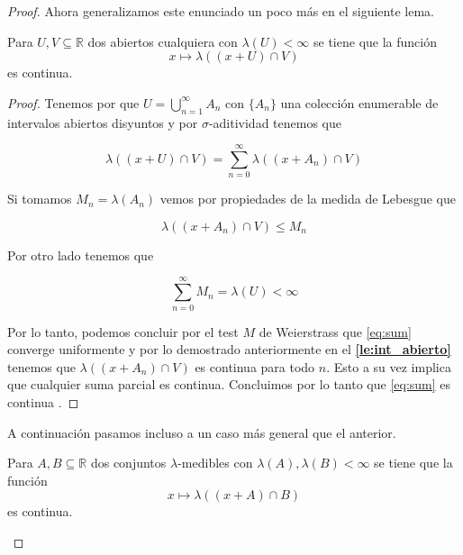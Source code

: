 \documentclass[letter,twoside,12pt]{article}
\numberwithin{equation}{section}
\begin{document}
\begin{proof}
Ahora generalizamos este enunciado un poco más en el siguiente lema.

\begin{lemma} \label{le:abierto}
Para $ U, V \subseteq \mathbb{R}$ dos abiertos cualquiera con $ \lambda(U) < \infty $ se tiene que la función
\begin{equation*}
	x \mapsto \lambda((x+U) \cap V ) \nonumber
\end{equation*} es continua. 
\end{lemma}

\begin{proof}
Tenemos por \cite[Teorema 6.59]{hewitt} que $U = \bigcup_{n = 1}^\infty A_n $ con $\{A_n\}$ una colección enumerable de intervalos abiertos disyuntos y por $\sigma$-aditividad tenemos que

\begin{equation}
\lambda((x+U) \cap V ) = \sum_{n=0}^\infty \lambda((x+A_n) \cap V ) \label{eq:sum}
\end{equation}

Si tomamos $M_n = \lambda(A_n)$ vemos por propiedades de la medida de Lebesgue que 

\begin{equation*}
 \lambda((x+A_n) \cap V ) \leq M_n \nonumber
\end{equation*}

Por otro lado tenemos que

\begin{equation*}
\sum_{n=0}^\infty  M_n = \lambda(U) < \infty \nonumber
\end{equation*}
 
Por lo tanto, podemos concluir por el test $M$ de Weierstrass \cite[Teorema 7.10]{rudin} que \eqref{eq:sum} converge uniformente y por lo demostrado anteriormente en el \textbf{\autoref{le:int_abierto}} tenemos que $ \lambda((x+A_n) \cap V ) $ es continua para todo $n$. Esto a su vez implica que cualquier suma parcial es continua. Concluimos por lo tanto que \eqref{eq:sum} es continua \cite[Teorema 7.12]{rudin}.\end{proof}
A continuación pasamos incluso a un caso más general que el anterior.

\begin{lemma}
Para $ A, B \subseteq \mathbb{R}$ dos conjuntos $ \lambda  $-medibles con $ \lambda(A), \lambda(B)  < \infty $ se tiene que la función
\begin{equation}
	x \mapsto \lambda((x+A) \cap B ) \label{eq:fmed}
\end{equation} es continua. \label{le:medible}
\end{lemma}


\end{proof}
\end{document}
